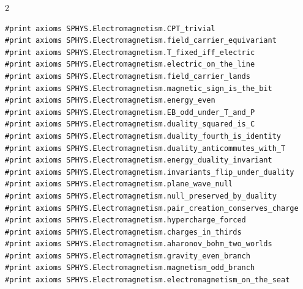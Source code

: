 \documentclass[10pt]{article}
\begin{document}
\begin{multicols}{2}
\begin{Verbatim}[fontsize=\fontsize{6.0}{6.9}\selectfont,breaklines,breakanywhere,breaksymbolleft={}]
#print axioms SPHYS.Electromagnetism.CPT_trivial
#print axioms SPHYS.Electromagnetism.field_carrier_equivariant
#print axioms SPHYS.Electromagnetism.T_fixed_iff_electric
#print axioms SPHYS.Electromagnetism.electric_on_the_line
#print axioms SPHYS.Electromagnetism.field_carrier_lands
#print axioms SPHYS.Electromagnetism.magnetic_sign_is_the_bit
#print axioms SPHYS.Electromagnetism.energy_even
#print axioms SPHYS.Electromagnetism.EB_odd_under_T_and_P
#print axioms SPHYS.Electromagnetism.duality_squared_is_C
#print axioms SPHYS.Electromagnetism.duality_fourth_is_identity
#print axioms SPHYS.Electromagnetism.duality_anticommutes_with_T
#print axioms SPHYS.Electromagnetism.energy_duality_invariant
#print axioms SPHYS.Electromagnetism.invariants_flip_under_duality
#print axioms SPHYS.Electromagnetism.plane_wave_null
#print axioms SPHYS.Electromagnetism.null_preserved_by_duality
#print axioms SPHYS.Electromagnetism.pair_creation_conserves_charge
#print axioms SPHYS.Electromagnetism.hypercharge_forced
#print axioms SPHYS.Electromagnetism.charges_in_thirds
#print axioms SPHYS.Electromagnetism.aharonov_bohm_two_worlds
#print axioms SPHYS.Electromagnetism.gravity_even_branch
#print axioms SPHYS.Electromagnetism.magnetism_odd_branch
#print axioms SPHYS.Electromagnetism.electromagnetism_on_the_seat
\end{Verbatim}
\end{multicols}
\end{document}
